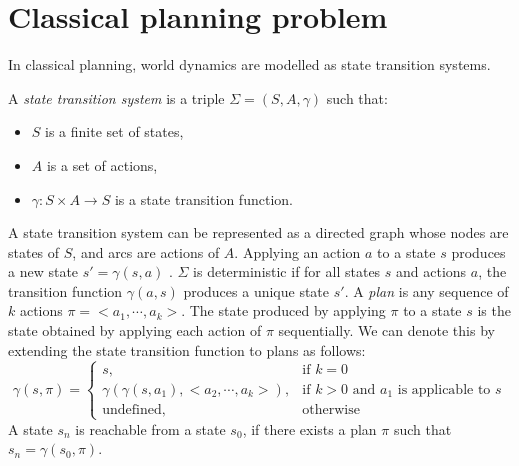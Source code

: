 \section{Classical planning problem}\label{subsec:Classical planning problem}
In classical planning, world dynamics are modelled as state transition systems.

\begin{definition}
A \textit{state transition system} is a triple $\Sigma = (S, A, \gamma)$ such that:
\begin{itemize}
\item $S$ is a finite set of states,
\item $A$ is a set of actions,
\item $\gamma : S \times A \rightarrow S$ is a state transition function.
\end{itemize}
\end{definition}

\noindent A state transition system can be represented as a directed graph whose nodes are states of $S$, and arcs are actions of $A$. 
Applying an action $a$ to a state $s$ produces a new state $s'= \gamma(s,a)$ 
. 
$\Sigma$ is deterministic if for all states $s$ and actions $a$, the transition function $\gamma(a, s)$ produces a unique state $s'$. 
A \textit{plan} is any sequence of $k$ actions $\pi = <a_1,\cdots, a_k>$. The state produced by applying $\pi$ to a state $s$ is the state obtained by applying each action of $\pi$ sequentially. 
We can denote this by extending the state transition function to plans as follows:
\[\gamma(s,\pi)=\left\{
\begin{array}{ll}
   s, &\mbox{if $k=0$} \\
   \gamma(\gamma(s,a_1),<a_2,\cdots, a_k>), &\mbox{if $k>0$ and $a_1$ is applicable to $s$} \\
   \mbox{undefined}, &\mbox{otherwise}
\end{array}
\right.
\]
A state $s_n$ is reachable from a state $s_0$, if there exists a plan $\pi$ such that $s_{n} = \gamma(s_0, \pi)$.\\


